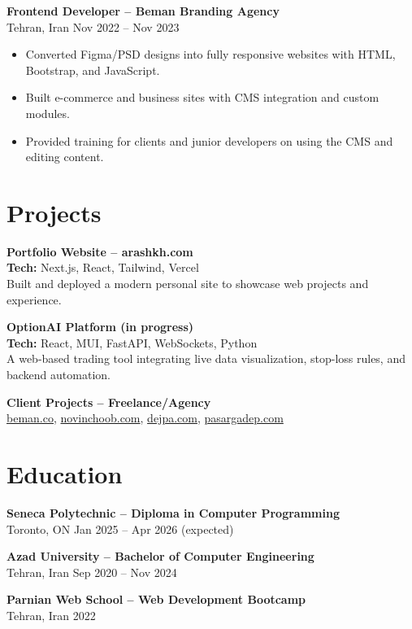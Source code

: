 \documentclass[letterpaper,11pt]{article}
\begin{document}
\textbf{Frontend Developer – Beman Branding Agency}\\
Tehran, Iran \hfill Nov 2022 -- Nov 2023
\begin{itemize}[leftmargin=*]
  \item Converted Figma/PSD designs into fully responsive websites with HTML, Bootstrap, and JavaScript.
  \item Built e-commerce and business sites with CMS integration and custom modules.
  \item Provided training for clients and junior developers on using the CMS and editing content.
\end{itemize}

\section*{Projects}
\textbf{Portfolio Website – arashkh.com} \\
\textbf{Tech:} Next.js, React, Tailwind, Vercel\\
Built and deployed a modern personal site to showcase web projects and experience.

\textbf{OptionAI Platform (in progress)}\\
\textbf{Tech:} React, MUI, FastAPI, WebSockets, Python\\
A web-based trading tool integrating live data visualization, stop-loss rules, and backend automation.

\textbf{Client Projects – Freelance/Agency}\\
\href{https://beman.co}{beman.co}, \href{https://novinchoob.com/en-us/}{novinchoob.com}, \href{https://dejpa.com}{dejpa.com}, \href{http://pasargadep.com/en/}{pasargadep.com}

\section*{Education}
\textbf{Seneca Polytechnic – Diploma in Computer Programming}\\
Toronto, ON \hfill Jan 2025 -- Apr 2026 (expected)

\textbf{Azad University – Bachelor of Computer Engineering}\\
Tehran, Iran \hfill Sep 2020 -- Nov 2024

\textbf{Parnian Web School – Web Development Bootcamp}\\
Tehran, Iran \hfill 2022
\end{document}
